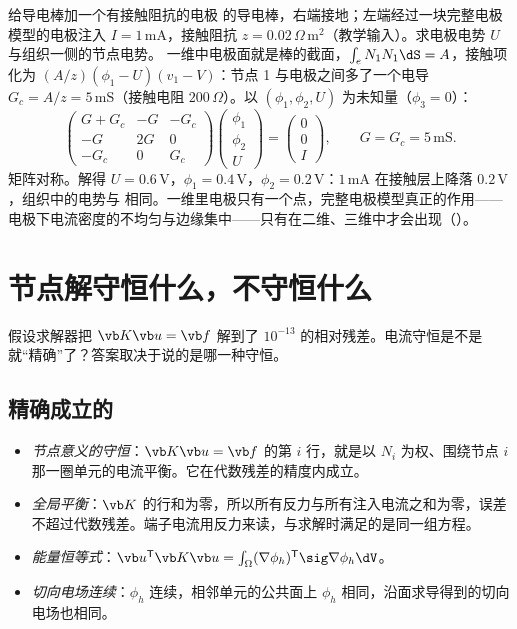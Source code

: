 \begin{example}[label=ex:femscalar-cembar]{给导电棒加一个有接触阻抗的电极}
 的导电棒，右端接地；左端经过一块完整电极模型的电极注入 $I=1\,\mathrm{mA}$，接触阻抗 $z=0.02\,\Omega\,\mathrm{m^2}$（教学输入）。求电极电势 $U$ 与组织一侧的节点电势。
\solution
一维中电极面就是棒的截面，$\int_eN_1N_1\dS=A$，接触项化为 $(A/z)(\phi_1-U)(v_1-V)$：节点 1 与电极之间多了一个电导 $G_c=A/z=5\,\mathrm{mS}$（接触电阻 $200\,\Omega$）。以 $(\phi_1,\phi_2,U)$ 为未知量（$\phi_3=0$）：
\begin{equation*}
\begin{pmatrix}G+G_c&-G&-G_c\\-G&2G&0\\-G_c&0&G_c\end{pmatrix}
\begin{pmatrix}\phi_1\\\phi_2\\U\end{pmatrix}=\begin{pmatrix}0\\0\\I\end{pmatrix},
\qquad G=G_c=5\,\mathrm{mS}.
\end{equation*}
矩阵对称。解得 $U=0.6\,\mathrm V$，$\phi_1=0.4\,\mathrm V$，$\phi_2=0.2\,\mathrm V$：$1\,\mathrm{mA}$ 在接触层上降落 $0.2\,\mathrm V$，组织中的电势与 相同。一维里电极只有一个点，完整电极模型真正的作用——电极下电流密度的不均匀与边缘集中——只有在二维、三维中才会出现（）。
\end{example}

\section{节点解守恒什么，不守恒什么}\label{sec:femscalar-conservation}

假设求解器把 $\vb K\vb u=\vb f$ 解到了 $10^{-13}$ 的相对残差。电流守恒是不是就“精确”了？答案取决于说的是哪一种守恒。

\subsection{精确成立的}
\begin{itemize}
\item \emph{节点意义的守恒}：$\vb K\vb u=\vb f$ 的第 $i$ 行，就是以 $N_i$ 为权、围绕节点 $i$ 那一圈单元的电流平衡。它在代数残差的精度内成立。
\item \emph{全局平衡}：$\vb K$ 的行和为零，所以所有反力与所有注入电流之和为零，误差不超过代数残差。端子电流用反力来读，与求解时满足的是同一组方程。
\item \emph{能量恒等式}：$\vb u^{\mathsf T}\vb K\vb u=\int_\Omega(\nabla\phi_h)^{\mathsf T}\sig\nabla\phi_h\dV$。
\item \emph{切向电场连续}：$\phi_h$ 连续，相邻单元的公共面上 $\phi_h$ 相同，沿面求导得到的切向电场也相同。
\end{itemize}


